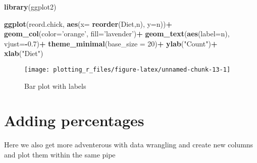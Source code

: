 \documentclass[
]{book}
\newenvironment{Shaded}{\begin{snugshade}}{\end{snugshade}}
\newcommand{\DataTypeTok}[1]{\textcolor[rgb]{0.13,0.29,0.53}{#1}}
\newcommand{\DecValTok}[1]{\textcolor[rgb]{0.00,0.00,0.81}{#1}}
\newcommand{\FloatTok}[1]{\textcolor[rgb]{0.00,0.00,0.81}{#1}}
\newcommand{\KeywordTok}[1]{\textcolor[rgb]{0.13,0.29,0.53}{\textbf{#1}}}
\newcommand{\NormalTok}[1]{#1}
\newcommand{\OperatorTok}[1]{\textcolor[rgb]{0.81,0.36,0.00}{\textbf{#1}}}
\newcommand{\StringTok}[1]{\textcolor[rgb]{0.31,0.60,0.02}{#1}}
\begin{document}
\begin{Shaded}
\begin{Highlighting}[]
\KeywordTok{library}\NormalTok{(ggplot2)}

\KeywordTok{ggplot}\NormalTok{(reord.chick, }\KeywordTok{aes}\NormalTok{(}\DataTypeTok{x=} \KeywordTok{reorder}\NormalTok{(Diet,n), }\DataTypeTok{y=}\NormalTok{n))}\OperatorTok{+}
\StringTok{  }\KeywordTok{geom_col}\NormalTok{(}\DataTypeTok{color=}\StringTok{'orange'}\NormalTok{, }\DataTypeTok{fill=}\StringTok{'lavender'}\NormalTok{)}\OperatorTok{+}
\StringTok{  }\KeywordTok{geom_text}\NormalTok{(}\KeywordTok{aes}\NormalTok{(}\DataTypeTok{label=}\NormalTok{n), }\DataTypeTok{vjust=}\OperatorTok{-}\FloatTok{0.7}\NormalTok{)}\OperatorTok{+}
\StringTok{  }\KeywordTok{theme_minimal}\NormalTok{(}\DataTypeTok{base_size =} \DecValTok{20}\NormalTok{)}\OperatorTok{+}
\StringTok{  }\KeywordTok{ylab}\NormalTok{(}\StringTok{"Count"}\NormalTok{)}\OperatorTok{+}\StringTok{ }\KeywordTok{xlab}\NormalTok{(}\StringTok{"Diet"}\NormalTok{)}
\end{Highlighting}
\end{Shaded}

\begin{figure}

{\centering \texttt{[image: plotting\_r\_files/figure-latex/unnamed-chunk-13-1]} 

}

\caption{Bar plot with labels}\label{fig:unnamed-chunk-13}
\end{figure}

\hypertarget{adding-percentages}{%
\section{Adding percentages}\label{adding-percentages}}

Here we also get more adventerous with data wrangling and create new columns and plot them within the same pipe
\end{document}
